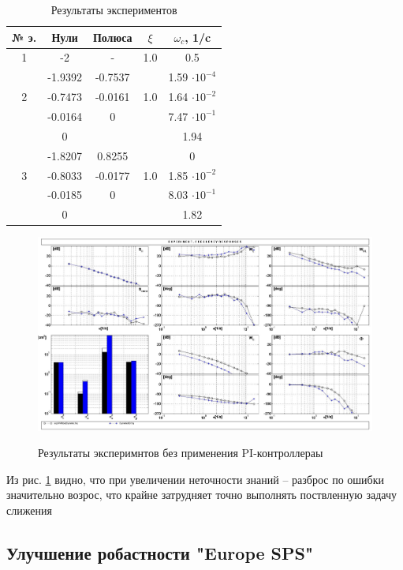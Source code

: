 \begin{table}[H]
    \caption{Результаты экспериментов}
    \centering
    \label{tab:Результаты экспериментов без PI2}
    \begin{tabular}{|c|c|c|c|c|}
        \hline 
        № э.&Нули & Полюса & $\xi$ & $\omega_c$, 1/c \\ \hline 
        1& -2 & - & 1.0 &0.5 \\ \hline
        & -1.9392 & -0.7537  &  & 1.59 $\cdot 10^{-4}$\\ 
        2& -0.7473 & -0.0161  &1.0 & 1.64 $\cdot 10^{-2}$\\ 
        & -0.0164 &  0 & &7.47 $\cdot 10^{-1}$\\ 
        & 0 &   &  &1.94 \\ \hline 
        & -1.8207 & 0.8255 & &0\\ 
        3& -0.8033 & -0.0177 & 1.0&1.85 $\cdot 10^{-2}$\\ 
        & -0.0185 & 0 & &8.03 $\cdot 10^{-1}$ \\ 
        & 0 &  &  &1.82 \\ \hline
    \end{tabular}
\end{table}


\begin{figure}[H]
    \centering \includegraphics[width=\linewidth]{Оглавление/Part3/figures/testo2.jpg}
    \caption{Результаты эксперимнтов без применения PI-контроллераы}
    {\label{fig:Модель без PI 80}}
\end{figure}
Из рис. {\ref{fig:Модель без PI 80}} видно, что при увеличении неточности знаний --  разброс по ошибки значительно возрос, что
крайне затрудняет точно выполнять поствленную задачу слижения

\subsection{Улучшение робастности "Europe SPS"}
{\label{sec:Улучшение робастности}}

